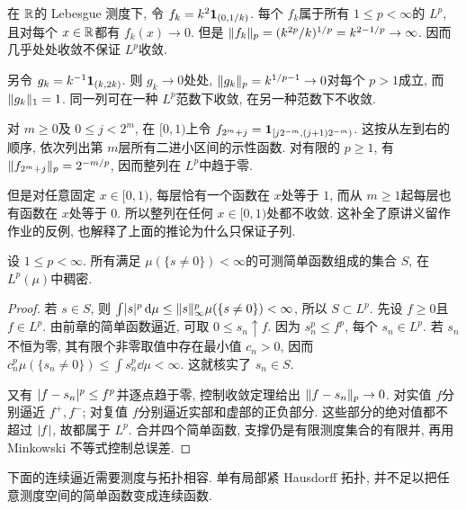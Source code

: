 \begin{example}\label{ra:c5:spikes}
在 $\mathbb R$的 Lebesgue 测度下, 令 $f_k=k^2\mathbf 1_{(0,1/k)}$. 每个 $f_k$属于所有 $1\le p<\infty$的 $L^p$, 且对每个 $x\in\mathbb R$都有 $f_k(x)\to0$. 但是 $\lVert f_k\rVert_p=(k^{2p}/k)^{1/p}=k^{2-1/p}\to\infty$. 因而几乎处处收敛不保证 $L^p$收敛.

另令 $g_k=k^{-1}\mathbf 1_{(k,2k)}$. 则 $g_k\to0$处处, $\lVert g_k\rVert_p=k^{1/p-1}\to0$对每个 $p>1$成立, 而 $\lVert g_k\rVert_1=1$. 同一列可在一种 $L^p$范数下收敛, 在另一种范数下不收敛.
\end{example}

\begin{example}\label{ra:c5:typewriter}
对 $m\ge0$及 $0\le j<2^m$, 在 $[0,1)$上令 $f_{2^m+j}=\mathbf 1_{[j2^{-m},(j+1)2^{-m})}$. 这按从左到右的顺序, 依次列出第 $m$层所有二进小区间的示性函数. 对有限的 $p\ge1$, 有 $\lVert f_{2^m+j}\rVert_p=2^{-m/p}$, 因而整列在 $L^p$中趋于零.

但是对任意固定 $x\in[0,1)$, 每层恰有一个函数在 $x$处等于 $1$, 而从 $m\ge1$起每层也有函数在 $x$处等于 $0$. 所以整列在任何 $x\in[0,1)$处都不收敛. 这补全了原讲义留作作业的反例, 也解释了上面的推论为什么只保证子列.
\end{example}


\begin{theorem}\label{ra:c5:simple-density}
设 $1\le p<\infty$. 所有满足 $\mu(\{s\ne0\})<\infty$的可测简单函数组成的集合 $S$, 在 $L^p(\mu)$中稠密.
\end{theorem}
\begin{proof}
若 $s\in S$, 则 $\int\lvert s\rvert^p\,\mathrm d\mu\le\lVert s\rVert_\infty^p\mu(\{s\ne0\})<\infty$, 所以 $S\subset L^p$. 先设 $f\ge0$且 $f\in L^p$. 由前章的简单函数逼近, 可取 $0\le s_n\uparrow f$. 因为 $s_n^p\le f^p$, 每个 $s_n\in L^p$. 若 $s_n$不恒为零, 其有限个非零取值中存在最小值 $c_n>0$, 因而 $c_n^p\mu(\{s_n\ne0\})\le\int s_n^p\dd\mu<\infty$. 这就核实了 $s_n\in S$.

又有 $\lvert f-s_n\rvert^p\le f^p$并逐点趋于零, 控制收敛定理给出 $\lVert f-s_n\rVert_p\to0$. 对实值 $f$分别逼近 $f^+,f^-$; 对复值 $f$分别逼近实部和虚部的正负部分. 这些部分的绝对值都不超过 $\lvert f\rvert$, 故都属于 $L^p$. 合并四个简单函数, 支撑仍是有限测度集合的有限并, 再用 Minkowski 不等式控制总误差.
\end{proof}

下面的连续逼近需要测度与拓扑相容. 单有局部紧 Hausdorff 拓扑, 并不足以把任意测度空间的简单函数变成连续函数.

